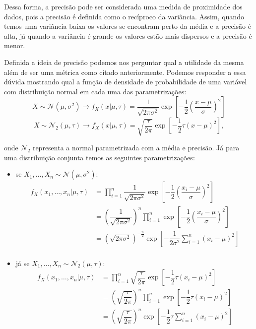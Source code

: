 \documentclass{article}
\begin{document}
Dessa forma, a precisão pode ser considerada uma medida de proximidade dos dados, pois a precisão é definida como o recíproco da variância. Assim, quando temos uma variância baixa os valores se encontram perto da média e a precisão é alta, já quando a variância é grande os valores estão mais dispersos e a precisão é menor.

Definida a ideia de precisão podemos nos perguntar qual a utilidade da mesma além de ser uma métrica como citado anteriormente. Podemos responder a essa dúvida mostrando qual a função de densidade de probabilidade de uma variável com distribuição normal em cada uma das parametrizações:
\[X \sim \mathcal{N}(\mu, \sigma^2) \longrightarrow f_X(x | \mu, \tau) = \dfrac{1}{\sqrt{2\pi \sigma^2}}\exp{\left[-\dfrac{1}{2}\left(\dfrac{x - \mu}{\sigma}\right)^2\right]}\]
\[X \sim \mathcal{N}_2(\mu, \tau) \longrightarrow f_X(x | \mu, \tau) = \sqrt{\dfrac{\tau}{2\pi}}\exp{\left[-\dfrac{1}{2}\tau(x - \mu)^2\right]},\]

\noindent onde $\mathcal{N}_2$ representa a normal parametrizada com a média e precisão. Já para uma distribuição conjunta temos as seguintes parametrizações:
\begin{itemize}
    \item
        se $X_1, \dots, X_n \sim \mathcal{N}(\mu, \sigma^2)$:
        \begin{equation*}
            \begin{split}
                f_X(x_1, \dots, x_n | \mu, \tau) & = \prod_{i = 1}^{n} \dfrac{1}{\sqrt{2\pi \sigma^2}}\exp{\left[-\dfrac{1}{2}\left(\dfrac{x_i - \mu}{\sigma}\right)^2\right]} \\
                & = \left(\dfrac{1}{\sqrt{2\pi \sigma^2}}\right)^n \prod_{i = 1}^{n} \exp{\left[-\dfrac{1}{2}\left(\dfrac{x_i - \mu}{\sigma}\right)^2\right]} \\
                & = \left(\sqrt{2\pi \sigma^2}\right)^{-\frac{n}{2}} \exp{\left[-\dfrac{1}{2\sigma^2}\sum_{i = 1}^{n}\left(x_i - \mu\right)^2\right]} \\
            \end{split}
        \end{equation*}
        
    \item
        já se $X_1, \dots, X_n \sim \mathcal{N}_2(\mu, \tau)$:
        \begin{equation}
            \label{eq1}
            \begin{split}
                f_X(x_1, \dots, x_n | \mu, \tau) & = \prod_{i = 1}^{n} \sqrt{\dfrac{\tau}{2\pi}}\exp{\left[-\dfrac{1}{2}\tau(x_i - \mu)^2\right]} \\
                & = \left(\sqrt{\dfrac{\tau}{2\pi}}\right)^n \prod_{i = 1}^{n} \exp{\left[-\dfrac{1}{2}\tau\left(x_i - \mu\right)^2\right]} \\
                & = \left(\sqrt{\dfrac{\tau}{2\pi}}\right)^n \exp{\left[-\dfrac{1}{2}\tau\sum_{i = 1}^{n}\left(x_i - \mu\right)^2\right]} \\
            \end{split}
        \end{equation}
\end{itemize}
\end{document}
